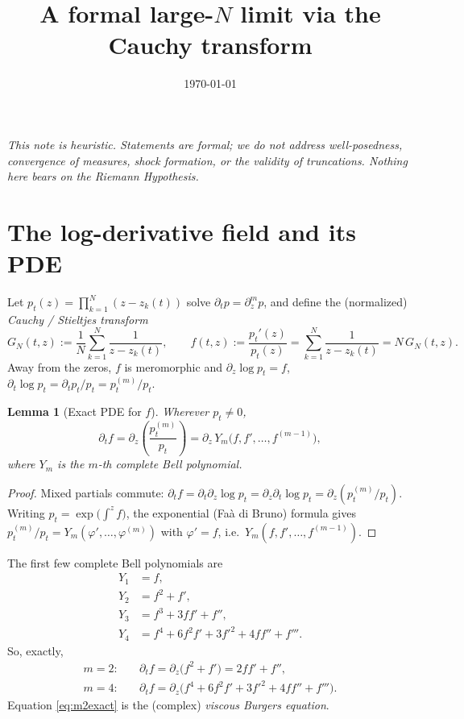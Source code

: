 \documentclass[11pt]{article}
\title{A formal large-$N$ limit via the Cauchy transform}
\author{}
\date{\today}
\theoremstyle{plain}
\newtheorem{lemma}{Lemma}
\theoremstyle{definition}
\newcommand{\dt}{\partial_t}
\newcommand{\dz}{\partial_z}
\newcommand{\GN}{G_N}
\begin{document}
\maketitle

\begin{center}\itshape
This note is heuristic. Statements are formal; we do not address
well-posedness, convergence of measures, shock formation, or the validity of
truncations. Nothing here bears on the Riemann Hypothesis.
\end{center}

\section{The log-derivative field and its PDE}

Let $p_t(z)=\prod_{k=1}^N(z-z_k(t))$ solve $\dt p=\dz^m p$, and define the
(normalized) \emph{Cauchy / Stieltjes transform}
\begin{equation}\label{eq:GN}
  \GN(t,z):=\frac1N\sum_{k=1}^N\frac{1}{z-z_k(t)},
  \qquad
  f(t,z):=\frac{p_t'(z)}{p_t(z)}=\sum_{k=1}^N\frac{1}{z-z_k(t)}=N\,\GN(t,z).
\end{equation}
Away from the zeros, $f$ is meromorphic and
$\dz\log p_t=f$, $\dt\log p_t=\dt p_t/p_t=p_t^{(m)}/p_t$.

\begin{lemma}[Exact PDE for $f$]\label{lem:pde}
Wherever $p_t\neq0$,
\begin{equation}\label{eq:pde}
  \dt f=\dz\!\left(\frac{p_t^{(m)}}{p_t}\right)
       =\dz\,Y_m\!\bigl(f,f',\dots,f^{(m-1)}\bigr),
\end{equation}
where $Y_m$ is the $m$-th complete Bell polynomial.
\end{lemma}

\begin{proof}
Mixed partials commute:
$\dt f=\dt\dz\log p_t=\dz\dt\log p_t=\dz(p_t^{(m)}/p_t)$. Writing
$p_t=\exp\!\bigl(\int^z f\bigr)$, the exponential (Fa\`a di Bruno) formula gives
$p_t^{(m)}/p_t=Y_m(\varphi',\dots,\varphi^{(m)})$ with $\varphi'=f$, i.e.\
$Y_m(f,f',\dots,f^{(m-1)})$.
\end{proof}

The first few complete Bell polynomials are
\begin{align*}
  Y_1&=f,\\
  Y_2&=f^2+f',\\
  Y_3&=f^3+3ff'+f'',\\
  Y_4&=f^4+6f^2f'+3f'^2+4ff''+f'''.
\end{align*}
So, exactly,
\begin{align}
  m=2:&\quad \dt f=\dz\bigl(f^2+f'\bigr)=2ff'+f'',\label{eq:m2exact}\\
  m=4:&\quad \dt f=\dz\bigl(f^4+6f^2f'+3f'^2+4ff''+f'''\bigr).\label{eq:m4exact}
\end{align}
Equation \eqref{eq:m2exact} is the (complex) \emph{viscous Burgers equation}.
\end{document}
